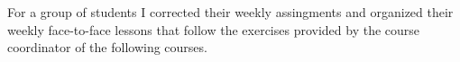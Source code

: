 For a group of students I corrected their weekly assingments and organized their
weekly face-to-face lessons that follow the exercises provided by the course
coordinator of the following courses.

\medskip
{}
